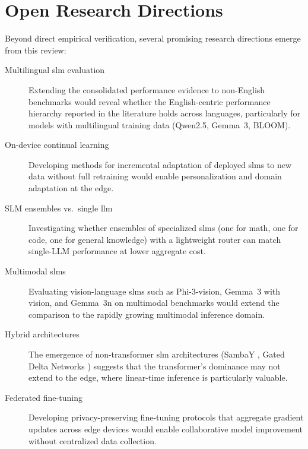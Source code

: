 
\section{Open Research Directions}
\label{supp:directions}

Beyond direct empirical verification, several promising research directions emerge from this review:

\begin{description}
    \item[Multilingual \gls{slm} evaluation] Extending the consolidated performance evidence to non-English benchmarks would reveal whether the English-centric performance hierarchy reported in the literature holds across languages, particularly for models with multilingual training data (Qwen2.5, Gemma~3, BLOOM).

    \item[On-device continual learning] Developing methods for incremental adaptation of deployed \glspl{slm} to new data without full retraining would enable personalization and domain adaptation at the edge.

    \item[SLM ensembles vs.\ single \gls{llm}] Investigating whether ensembles of specialized \glspl{slm} (one for math, one for code, one for general knowledge) with a lightweight router can match single-LLM performance at lower aggregate cost.

    \item[Multimodal \glspl{slm}] Evaluating vision-language \glspl{slm} such as Phi-3-vision, Gemma~3 with vision, and Gemma~3n \citep{google2025gemma3n} on multimodal benchmarks would extend the comparison to the rapidly growing multimodal inference domain.

    \item[Hybrid architectures] The emergence of non-transformer \gls{slm} architectures (SambaY \citep{ren2025sambay}, Gated Delta Networks \citep{yang2025gated_delta}) suggests that the transformer's dominance may not extend to the edge, where linear-time inference is particularly valuable.

    \item[Federated fine-tuning] Developing privacy-preserving fine-tuning protocols that aggregate gradient updates across edge devices would enable collaborative model improvement without centralized data collection.
\end{description}
